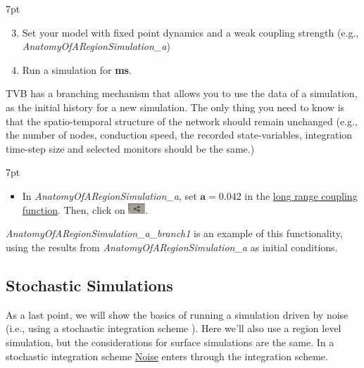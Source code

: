 \documentclass{tufte-handout}
\newenvironment{simulation}{%
  \def\FrameCommand{%
    \hspace{1pt}%
    {\color{ForestGreen}\vrule width 2pt}%
    {\color{simulationshade}\vrule width 4pt}%
    \colorbox{simulationshade}%
  }%
  \MakeFramed{\advance\hsize-\width\FrameRestore}%
  \noindent\hspace{-4.55pt}%
  \begin{adjustwidth}{}{7pt}%
  \vspace{2pt}\vspace{2pt}%
}
{%
  \vspace{2pt}\end{adjustwidth}\endMakeFramed%
}
\begin{document}
\begin{simulation}
\begin{enumerate}[resume]
 \setcounter{enumi}{2}
\item Set your model with fixed point dynamics and a weak coupling strength (e.g., \textit{AnatomyOfARegionSimulation\_a})
\item Run a simulation for \textbf{\unit[1000]{ms}}.
\end{enumerate}
\end{simulation}

TVB has a branching mechanism that allows you to use the data of a simulation, as the initial history for a new simulation. The only thing you
need to know is that the spatio-temporal structure of the network should
remain unchanged (e.g., the number of nodes, conduction speed, the recorded state-variables, integration time-step size and selected monitors should be the same.)

\begin{simulation}
\begin{itemize}[resume]
 \setcounter{enumi}{4}
 \item In \textit{AnatomyOfARegionSimulation\_a}, set $\mathbf{a=0.042}$ in the \underline{long range coupling function}. Then, click on \includegraphics[width=0.05\textwidth]{butt_branching.png}. 
\end{itemize}
\end{simulation}

\textit{AnatomyOfARegionSimulation\_a\_branch1} is an example of this functionality, using the results from \textit{AnatomyOfARegionSimulation\_a} as initial conditions. 

\subsection{Stochastic Simulations}\label{sec:noisy_simulations}


As a last point, we will show the basics of running a simulation driven by
noise (i.e., using a stochastic integration scheme ). Here we'll also use a region
level simulation, but the considerations for surface simulations are the same.
In a stochastic integration scheme \underline{Noise} enters through the integration
scheme. 
\end{document}
